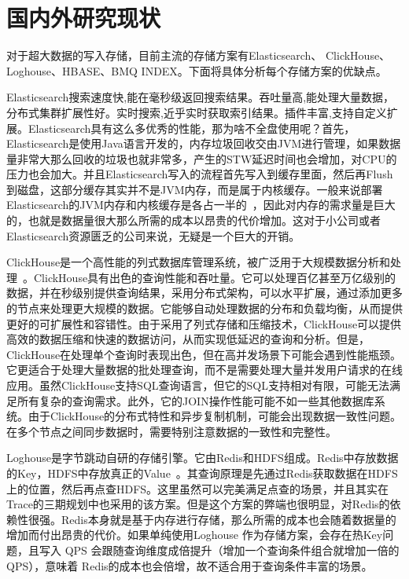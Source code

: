 \section{国内外研究现状}
对于超大数据的写入存储，目前主流的存储方案有Elasticsearch、 ClickHouse、Loghouse、HBASE、BMQ INDEX。下面将具体分析每个存储方案的优缺点。

Elasticsearch搜索速度快,能在毫秒级返回搜索结果。吞吐量高,能处理大量数据，分布式集群扩展性好。实时搜索,近乎实时获取索引结果。插件丰富,支持自定义扩展。Elasticsearch具有这么多优秀的性能，那为啥不全盘使用呢？首先，Elasticsearch是使用Java语言开发的，内存垃圾回收交由JVM进行管理，如果数据量非常大那么回收的垃圾也就非常多，产生的STW延迟时间也会增加，对CPU的压力也会加大。并且Elasticsearch写入的流程首先写入到缓存里面，然后再Flush到磁盘，这部分缓存其实并不是JVM内存，而是属于内核缓存。一般来说部署Elasticsearch的JVM内存和内核缓存是各占一半的~\cite{许贤慧2022面向工程数据检索的}，因此对内存的需求量是巨大的，也就是数据量很大那么所需的成本以昂贵的代价增加。这对于小公司或者Elasticsearch资源匮乏的公司来说，无疑是一个巨大的开销。

ClickHouse是一个高性能的列式数据库管理系统，被广泛用于大规模数据分析和处理~\cite{高翔2022基于}。ClickHouse具有出色的查询性能和吞吐量。它可以处理百亿甚至万亿级别的数据，并在秒级别提供查询结果，采用分布式架构，可以水平扩展，通过添加更多的节点来处理更大规模的数据。它能够自动处理数据的分布和负载均衡，从而提供更好的可扩展性和容错性。由于采用了列式存储和压缩技术，ClickHouse可以提供高效的数据压缩和快速的数据访问，从而实现低延迟的查询和分析。但是，ClickHouse在处理单个查询时表现出色，但在高并发场景下可能会遇到性能瓶颈。它更适合于处理大量数据的批处理查询，而不是需要处理大量并发用户请求的在线应用。虽然ClickHouse支持SQL查询语言，但它的SQL支持相对有限，可能无法满足所有复杂的查询需求。此外，它的JOIN操作性能可能不如一些其他数据库系统。由于ClickHouse的分布式特性和异步复制机制，可能会出现数据一致性问题。在多个节点之间同步数据时，需要特别注意数据的一致性和完整性。

Loghouse是字节跳动自研的存储引擎。它由Redis和HDFS组成。Redis中存放数据的Key，HDFS中存放真正的Value~\cite{吴加禹2020一种读写均衡的高性能键值存储系统}。其查询原理是先通过Redis获取数据在HDFS上的位置，然后再点查HDFS。这里虽然可以完美满足点查的场景，并且其实在Trace的三期规划中也采用的该方案。但是这个方案的弊端也很明显，对Redis的依赖性很强。Redis本身就是基于内存进行存储，那么所需的成本也会随着数据量的增加而付出昂贵的代价。如果单纯使用Loghouse 作为存储方案，会存在热Key问题，且写入 QPS 会跟随查询维度成倍提升（增加一个查询条件组合就增加一倍的QPS），意味着 Redis的成本也会倍增，故不适合用于查询条件丰富的场景。


